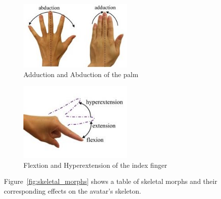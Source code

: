 \documentclass[../../main.tex]{subfiles}
\begin{document}
\begin{figure}
    \centering
    \includegraphics[width=0.5\textwidth]{chapters/avatar_creation_pose_synthesis/images/adduction_abduction.jpg}
    \caption{Adduction and Abduction of the palm}
    \label{fig:adduction_abduction}
\end{figure}

\begin{figure}
    \centering
    \includegraphics[width=0.5\textwidth]{chapters/avatar_creation_pose_synthesis/images/hyper-extension_flexion.jpg}
    \caption{Flextion and Hyperextension of the index finger}
    \label{fig:hyper-extension_flexion}
\end{figure}

Figure~\ref{fig:skeletal_morphs} shows a table of skeletal morphs and their corresponding effects on the avatar's skeleton.
\end{document}
